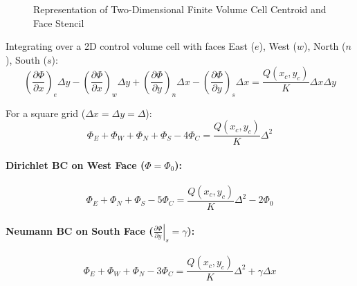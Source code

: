 \documentclass{article}
\begin{document}
\begin{figure}[H]
    \centering
    \caption{Representation of Two-Dimensional Finite Volume Cell Centroid and Face Stencil}
\end{figure}

Integrating over a 2D control volume cell with faces East ($e$), West ($w$), North ($n$), South ($s$):
\begin{equation}
    \left(\frac{\partial\Phi}{\partial x}\right)_e \Delta y - \left(\frac{\partial\Phi}{\partial x}\right)_w \Delta y + \left(\frac{\partial\Phi}{\partial y}\right)_n \Delta x - \left(\frac{\partial\Phi}{\partial y}\right)_s \Delta x = \frac{Q(x_c,y_c)}{K} \Delta x \Delta y
\end{equation}

For a square grid ($\Delta x = \Delta y = \Delta$):
\begin{equation}
    \Phi_E + \Phi_W + \Phi_N + \Phi_S - 4\Phi_C = \frac{Q(x_c,y_c)}{K} \Delta^2
\end{equation}

\paragraph{Dirichlet BC on West Face ($\Phi = \Phi_0$):}
\begin{equation}
    \Phi_E + \Phi_N + \Phi_S - 5\Phi_C = \frac{Q(x_c,y_c)}{K} \Delta^2 - 2\Phi_0
\end{equation}

\paragraph{Neumann BC on South Face ($\left.\frac{\partial\Phi}{\partial y}\right|_s = \gamma$):}
\begin{equation}
    \Phi_E + \Phi_W + \Phi_N - 3\Phi_C = \frac{Q(x_c,y_c)}{K} \Delta^2 + \gamma \Delta x
\end{equation}
\end{document}
